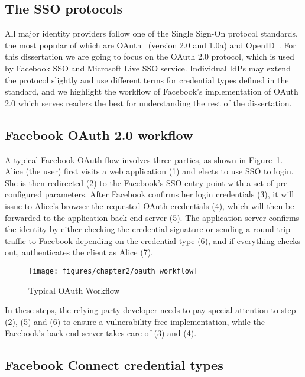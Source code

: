\subsection{The SSO protocols}
\label{sec:bg_sso_protocol}
All major identity providers follow one of the Single Sign-On protocol standards, the most popular of which are OAuth~\cite{OAuth2.0} (version 2.0 and 1.0a) and OpenID~\cite{openID}.  For this dissertation we are going to focus on the OAuth 2.0 protocol, which is used by Facebook SSO and Microsoft Live SSO service.  Individual IdPs may extend the protocol slightly and use different terms for credential types defined in the standard, and we highlight the workflow of Facebook's implementation of OAuth 2.0 which serves readers the best for understanding the rest of the dissertation.

\subsection{Facebook OAuth 2.0 workflow}

A typical Facebook OAuth flow involves three parties, as shown in Figure~\ref{fig:oauth_workflow}.  Alice (the user) first visits a web application (1) and elects to use SSO to login.  She is then redirected (2) to the Facebook's SSO entry point with a set of pre-configured parameters.  After Facebook confirms her login credentials (3), it will issue to Alice's browser the requested OAuth credentials (4), which will then be forwarded to the application back-end server (5).  The application server confirms the identity by either checking the credential signature or sending a round-trip traffic to Facebook depending on the credential type (6), and if everything checks out, authenticates the client as Alice (7).

\begin{figure}[bth]
\centering
\texttt{[image: figures/chapter2/oauth\_workflow]}
\caption{Typical OAuth Workflow}
\label{fig:oauth_workflow}
\end{figure}

In these steps, the relying party developer needs to pay special attention to step (2), (5) and (6) to ensure a vulnerability-free implementation, while the Facebook's back-end server takes care of (3) and (4).

\subsection{Facebook Connect credential types}

